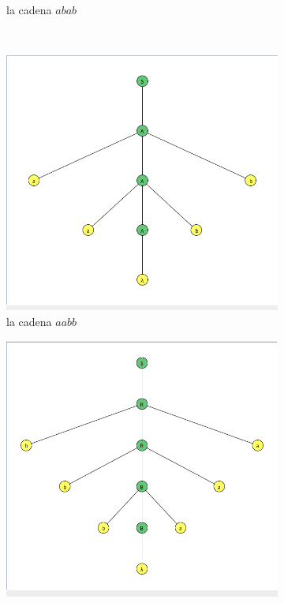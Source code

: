 \documentclass{article}
\begin{document}
\begin{flushleft}
\begin{enumerate}
\begin{figure}[h]
\begin{subfigure}[b]{0.4\textwidth}
                        \caption{la cadena $abab$}
                        \label{fig:label15}
                    \end{subfigure}
                    \vspace{0.5cm} 
                    \\
                    \begin{subfigure}[b]{0.4\textwidth}
                        \centering
                        \includegraphics[width=\textwidth]{./Imagenes/grafo7.png}
                        \caption{la cadena $aabb$}
                        \label{fig:label16}
                    \end{subfigure}
                    \hfill
                    \begin{subfigure}[b]{0.4\textwidth}
                        \centering
                        \includegraphics[width=\textwidth]{./Imagenes/grafobbbaaa.png}

\end{subfigure}
\end{figure}
\end{enumerate}
\end{flushleft}
\end{document}
